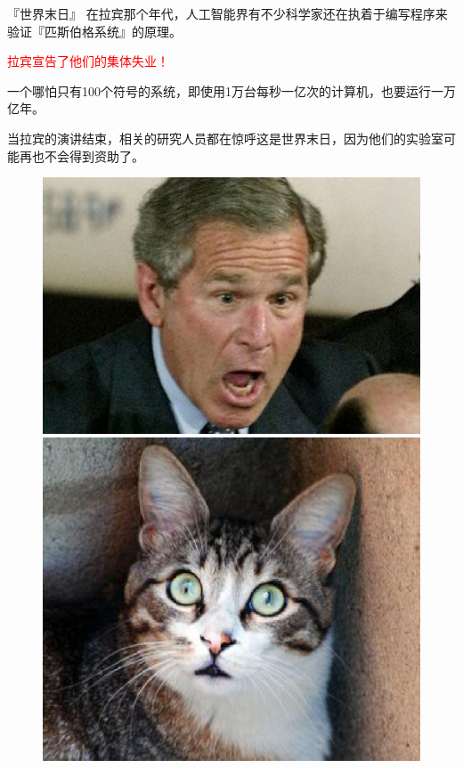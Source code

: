 \documentclass{beamer}
\begin{document}
\begin{frame}{『世界末日』}
	在拉宾那个年代，人工智能界有不少科学家还在执着于编写程序来验证『匹斯伯格系统』的原理。\pause
	
	\textcolor{red}{拉宾宣告了他们的集体失业！}\pause
	
	一个哪怕只有100个符号的系统，即使用1万台每秒一亿次的计算机，也要运行一万亿年。\pause
	
	当拉宾的演讲结束，相关的研究人员都在惊呼这是世界末日，因为他们的实验室可能再也不会得到资助了。
	\begin{figure}
		\begin{minipage}[b]{0.3\textwidth}\centering
			\includegraphics[scale=0.15]{figures/mgd1.eps}
		\end{minipage}
		\begin{minipage}[b]{0.3\textwidth}\centering
			\includegraphics[scale=0.15]{figures/mgd2.eps}

\end{minipage}
\end{figure}
\end{frame}
\end{document}
